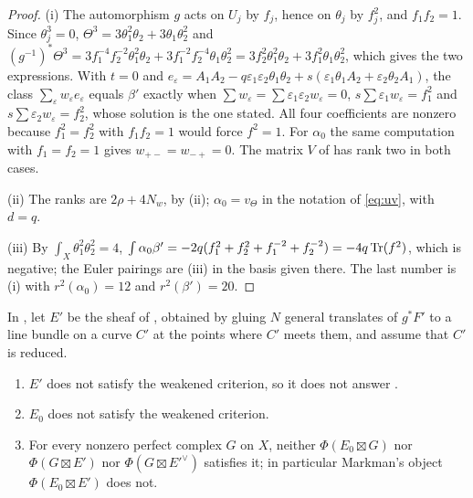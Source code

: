 \begin{proof}
(i) The automorphism $g$ acts on $U_{j}$ by $f_{j}$, hence on $\theta_{j}$ by
$f_{j}^{2}$, and $f_{1}f_{2}=1$. Since $\theta_{j}^{3}=0$,
$\Theta^{3}=3\theta_{1}^{2}\theta_{2}+3\theta_{1}\theta_{2}^{2}$ and
$(g^{-1})^{*}\Theta^{3}=3f_{1}^{-4}f_{2}^{-2}\theta_{1}^{2}\theta_{2}
+3f_{1}^{-2}f_{2}^{-4}\theta_{1}\theta_{2}^{2}
=3f_{2}^{2}\theta_{1}^{2}\theta_{2}+3f_{1}^{2}\theta_{1}\theta_{2}^{2}$, which
gives the two expressions. With $t=0$ and
$e_{\varepsilon}=A_{1}A_{2}-q\varepsilon_{1}\varepsilon_{2}\theta_{1}\theta_{2}
+s(\varepsilon_{1}\theta_{1}A_{2}+\varepsilon_{2}\theta_{2}A_{1})$, the class
$\sum_{\varepsilon}w_{\varepsilon}e_{\varepsilon}$ equals $\beta'$ exactly when
$\sum w_{\varepsilon}=\sum\varepsilon_{1}\varepsilon_{2}w_{\varepsilon}=0$,
$s\sum\varepsilon_{1}w_{\varepsilon}=f_{1}^{2}$ and
$s\sum\varepsilon_{2}w_{\varepsilon}=f_{2}^{2}$, whose solution is the one
stated. All four coefficients are nonzero because $f_{1}^{2}=f_{2}^{2}$ with
$f_{1}f_{2}=1$ would force $f^{2}=1$. For $\alpha_{0}$ the same computation
with $f_{1}=f_{2}=1$ gives $w_{+-}=w_{-+}=0$. The matrix $V$ of
 has rank two in both cases.

(ii) The ranks are $2\rho+4N_{w}$, by (ii);
$\alpha_{0}=v_{\Theta}$ in the notation of \eqref{eq:uv}, with $d=q$.

(iii) By $\int_{X}\theta_{1}^{2}\theta_{2}^{2}=4$,
$\int\alpha_{0}\beta'=-2q(f_{1}^{2}+f_{2}^{2}+f_{1}^{-2}+f_{2}^{-2})=-4q\operatorname{Tr}(f^{2})$,
which is negative; the Euler pairings are
(iii) in the basis given there. The last number is
(i) with $r^{2}(\alpha_{0})=12$ and
$r^{2}(\beta')=20$.
\end{proof}

\begin{corollary}\label{cor:markmanquarticfails}
In , let $E'$ be the sheaf of
\cite[Example~11.2.7]{Mar25c}, obtained by gluing $N$ general translates of
$g^{*}F'$ to a line bundle on a curve $C'$ at the points where $C'$ meets
them, and assume that $C'$ is reduced.
\begin{enumerate}[label=\textup{(\roman*)},leftmargin=2.6em,itemsep=2pt]
\item $E'$ does not satisfy the weakened criterion, so it does not answer
  \cite[Question~11.2.2]{Mar25c}.
\item $E_{0}$ does not satisfy the weakened criterion.
\item For every nonzero perfect complex $G$ on $X$, neither
  $\Phi(E_{0}\boxtimes G)$ nor $\Phi(G\boxtimes E')$ nor
  $\Phi(G\boxtimes E'^{\vee})$ satisfies it; in particular Markman's object
  $\Phi(E_{0}\boxtimes E')$ does not.
\end{enumerate}
\end{corollary}

